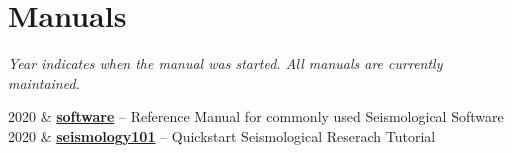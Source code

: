 \section{Manuals}

\textit{Year indicates when the manual was started. All manuals are currently maintained.}

\begin{EntriesTable}{0.05}{0.02}{0.93}
2020 &	\textbf{\href{https://seismo-learn.org/software/}{software}} -- Reference Manual for commonly used Seismological Software \\
2020 &	\textbf{\href{https://seismo-learn.org/seismology101/}{seismology101}} -- Quickstart Seismological Reserach Tutorial \\
\end{EntriesTable}
